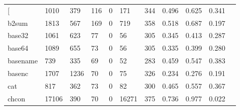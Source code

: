 \begin{longtable}{lp{1.10cm}p{1.10cm}p{1.10cm}p{1.10cm}p{1.10cm}p{1.10cm}p{1.10cm}p{1.10cm}p{1.10cm}p{1.10cm}}
\bottomrule
\endlastfoot
{[}         &                   1010 &                                379 &                               116 &                                0 &                               171 &                             344 &                          0.496 &                                 0.625 &                               0.341 \\
b2sum     &                   1813 &                                567 &                               169 &                                0 &                               719 &                             358 &                          0.518 &                                 0.687 &                               0.197 \\
base32    &                   1061 &                                623 &                                77 &                                0 &                                56 &                             305 &                          0.345 &                                 0.413 &                               0.287 \\
base64    &                   1089 &                                655 &                                73 &                                0 &                                56 &                             305 &                          0.335 &                                 0.399 &                               0.280 \\
basename  &                    739 &                                335 &                                69 &                                0 &                                52 &                             283 &                          0.459 &                                 0.547 &                               0.383 \\
basenc    &                   1707 &                               1236 &                                70 &                                0 &                                75 &                             326 &                          0.234 &                                 0.276 &                               0.191 \\
cat       &                    817 &                                362 &                                73 &                                0 &                                82 &                             300 &                          0.465 &                                 0.557 &                               0.367 \\
chcon     &                  17106 &                                390 &                                70 &                                0 &                             16271 &                             375 &                          0.736 &                                 0.977 &                               0.022 \\

\end{longtable}
